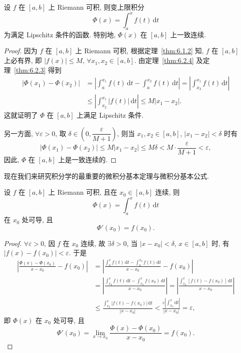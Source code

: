 \begin{theorem}\label{thm:6.3.1}
设 $f$ 在 $[a,b]$ 上 Riemann 可积, 则变上限积分
\[
\Phi(x)=\int_{a}^{x}f(t)\,\mathrm{d}t
\]
为满足 Lipschitz 条件的函数. 特别地, $\Phi(x)$ 在 $[a,b]$ 上一致连续.
\end{theorem}

\begin{proof}
因为 $f$ 在 $[a,b]$ 上 Riemann 可积, 根据定理~\ref{thm:6.1.2} 知, $f$ 在 $[a,b]$ 上必有界, 即 $|f(x)|\leqslant M$, $\forall x_{1},x_{2}\in[a,b]$. 由定理~\ref{thm:6.2.4} 及定理~\ref{thm:6.2.3} 得到
\begin{align*}
|\Phi(x_{1})-\Phi(x_{2})|&=\left|\int_{a}^{x_{1}}f(t)\,\mathrm{d}t-\int_{a}^{x_{2}}f(t)\,\mathrm{d}t\right|=\left|\int_{x_{2}}^{x_{1}}f(t)\,\mathrm{d}t\right|\\
&\leqslant\left|\int_{x_{2}}^{x_{1}}|f(t)|\,\mathrm{d}t\right|\leqslant M|x_{1}-x_{2}|.
\end{align*}
这就证明了 $\Phi$ 在 $[a,b]$ 上满足 Lipschitz 条件.

另一方面, $\forall\varepsilon>0$, 取 $\delta\in\left(0,\dfrac{\varepsilon}{M+1}\right)$, 则当 $x_{1},x_{2}\in[a,b]$, $|x_{1}-x_{2}|<\delta$ 时有
\[
|\Phi(x_{1})-\Phi(x_{2})|\leqslant M|x_{1}-x_{2}|\leqslant M\delta<M\cdot\frac{\varepsilon}{M+1}<\varepsilon,
\]
因此, $\Phi$ 在 $[a,b]$ 上是一致连续的.
\end{proof}

现在我们来研究积分学的最重要的微积分基本定理与微积分基本公式.

\begin{theorem}[微积分基本定理]\label{thm:6.3.2}
设 $f$ 在 $[a,b]$ 上 Riemann 可积, 且在 $x_{0}\in[a,b]$ 连续, 则
\[
\Phi(x)=\int_{a}^{x}f(t)\,\mathrm{d}t
\]
在 $x_{0}$ 处可导, 且
\[
\Phi'(x_{0})=f(x_{0}).
\]
\end{theorem}

\begin{proof}
$\forall\varepsilon>0$, 因 $f$ 在 $x_{0}$ 连续, 故 $\exists\delta>0$, 当 $|x-x_{0}|<\delta$, $x\in[a,b]$ 时, 有 $|f(x)-f(x_{0})|<\varepsilon$. 于是
\[
\begin{aligned}
\left|\frac{\Phi(x)-\Phi(x_{0})}{x-x_{0}}-f(x_{0})\right|&=\left|\frac{\int_{a}^{x}f(t)\,\mathrm{d}t-\int_{a}^{x_{0}}f(t)\,\mathrm{d}t}{x-x_{0}}-f(x_{0})\right|\\
&=\left|\frac{\int_{x_{0}}^{x}f(t)\,\mathrm{d}t-\int_{x_{0}}^{x}f(x_{0})\,\mathrm{d}t}{x-x_{0}}\right|=\left|\frac{\int_{x_{0}}^{x}[f(t)-f(x_{0})]\,\mathrm{d}t}{x-x_{0}}\right|\\
&\leqslant\frac{\int_{x_{0}}^{x}|f(t)-f(x_{0})|\,\mathrm{d}t}{|x-x_{0}|}<\frac{\varepsilon\left|\int_{x_{0}}^{x}\mathrm{d}t\right|}{|x-x_{0}|}=\varepsilon,
\end{aligned}
\]
即 $\Phi(x)$ 在 $x_{0}$ 处可导, 且
\[
\Phi'(x_{0})=\lim_{x\to x_{0}}\frac{\Phi(x)-\Phi(x_{0})}{x-x_{0}}=f(x_{0}).
\]
\end{proof}


